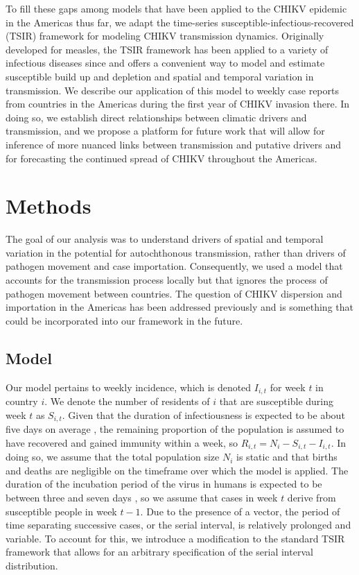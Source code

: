 \documentclass[11pt]{article}
\begin{document}
To fill these gaps among models that have been applied to the CHIKV epidemic in the Americas thus far, we adapt the time-series susceptible-infectious-recovered (TSIR) framework \cite{Finkenstadt2000} for modeling CHIKV transmission dynamics. Originally developed for measles, the TSIR framework has been applied to a variety of infectious diseases since \cite{Grenfell2001,Koelle2004,Xia2004,Pascual2008,Metcalf2010,Metcalf2011,Reich2013} and offers a convenient way to model and estimate susceptible build up and depletion and spatial and temporal variation in transmission. We describe our application of this model to weekly case reports from countries in the Americas during the first year of CHIKV invasion there. In doing so, we establish direct relationships between climatic drivers and transmission, and we propose a platform for future work that will allow for inference of more nuanced links between transmission and putative drivers and for forecasting the continued spread of CHIKV throughout the Americas.


\section*{Methods}
The goal of our analysis was to understand drivers of spatial and temporal variation in the potential for autochthonous transmission, rather than drivers of pathogen movement and case importation. Consequently, we used a model that accounts for the transmission process locally but that ignores the process of pathogen movement between countries. The question of CHIKV dispersion and importation in the Americas has been addressed previously \cite{Johansson2014,Cauchemez2014,Khan2014} and is something that could be incorporated into our framework in the future.

\subsection*{Model}
Our model pertains to weekly incidence, which is denoted $I_{i,t}$ for week $t$ in country $i$. We denote the number of residents of $i$ that are susceptible during week $t$ as $S_{i,t}$. Given that the duration of infectiousness is expected to be about five days on average \cite{Johansson2014}, the remaining proportion of the population is assumed to have recovered and gained immunity within a week, so $R_{i,t}=N_i-S_{i,t}-I_{i,t}$. In doing so, we assume that the total population size $N_i$ is static and that births and deaths are negligible on the timeframe over which the model is applied. The duration of the incubation period of the virus in humans is expected to be between three and seven days \cite{Staples2009}, so we assume that cases in week $t$ derive from susceptible people in week $t-1$. Due to the presence of a vector, the period of time separating successive cases, or the serial interval, is relatively prolonged and variable. To account for this, we introduce a modification to the standard TSIR framework that allows for an arbitrary specification of the serial interval distribution.
\end{document}
